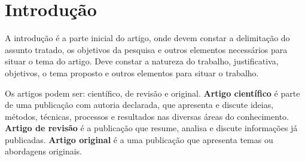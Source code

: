 \section{Introdução}

A introdução é a parte inicial do artigo, onde devem constar a delimitação do assunto tratado, os objetivos da pesquisa e outros elementos necessários para situar o tema do artigo. Deve constar a natureza do trabalho, justificativa, objetivos, o tema proposto e outros elementos para situar o trabalho. 

Os artigos podem ser: científico, de revisão e original. \textbf{Artigo científico} é parte de  uma publicação com autoria declarada, que apresenta e discute ideias, métodos, técnicas, processos e resultados nas diversas áreas do conhecimento. \textbf{Artigo de revisão} é a publicação que resume, analisa e discute  informações já publicadas. \textbf{Artigo original} é a uma publicação que apresenta temas ou abordagens originais. 